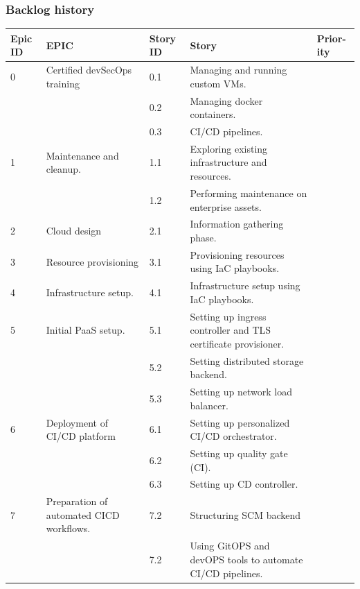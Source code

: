 \subsubsection{Backlog history }
\begin{longtable}[H]{|m{1cm}|m{3cm}|m{1cm}|m{7cm}|m{1.2cm}|}
\hline
 {\textbf{Epic ID}} & {\textbf{EPIC}} & {\textbf{Story ID}} & {\textbf{Story}} & {\textbf{Prior-ity}} \\
 \hline
0 & \raggedright Certified devSecOps training &	0.1 &	Managing and running custom VMs. & \\
\cline{3-5}
&   & 0.2 &	Managing docker containers.	& \\
\cline{3-5}
&   & 0.3 &	CI/CD pipelines. & \\
\hline
1 & Maintenance and cleanup. &	1.1	& Exploring existing infrastructure and resources. & \\
\cline{3-5}
&   &	1.2 & Performing maintenance on enterprise assets. & \\

\hline
2 & Cloud design &	2.1 &	Information gathering phase. & \\
\hline
3 & Resource provisioning &	3.1 &	Provisioning resources using IaC playbooks. & \\
\hline
4 & Infrastructure setup. &	4.1 &	Infrastructure setup using IaC playbooks. & \\
\hline
5 & \raggedright Initial PaaS setup. &	5.1 &	Setting up ingress controller and TLS certificate provisioner.	 & \\
\cline{3-5}
&   & 5.2 &	Setting distributed storage backend.	 & \\
\cline{3-5}
&   & 5.3 &	Setting up network load balancer.	 & \\
  \hline
6 & Deployment of CI/CD platform &	6.1 &	Setting up personalized CI/CD orchestrator.	 & \\
\cline{3-5}
&   & 6.2 &	Setting up quality gate (CI).	 & \\
\cline{3-5}
&   & 6.3 & Setting up CD controller.	 & \\
  \hline
7 & \raggedright Preparation of automated CICD workflows. &	7.2 &	Structuring SCM backend	 & \\
\cline{3-5}
&   & 7.2 &	 \raggedright Using GitOPS and devOPS tools to automate CI/CD pipelines.	 & \\
   \hline
   

\end{longtable}
